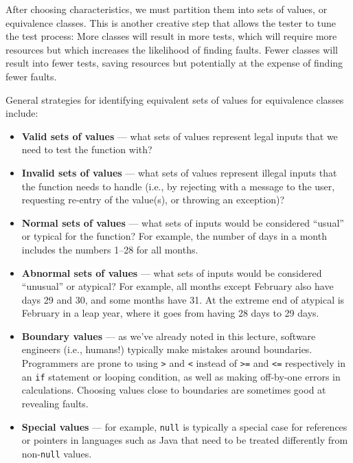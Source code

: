 After choosing characteristics, we must partition them into sets of values, or
equivalence classes. This is another creative step that allows the tester to
tune the test process: More classes will result in more tests, which will
require more resources but which increases the likelihood of finding faults.
Fewer classes will result into fewer tests, saving resources but potentially at
the expense of finding fewer faults. 

General strategies for identifying equivalent sets of values for equivalence
classes include:

\begin{itemize}

    \item {\bf Valid sets of values} --- what sets of values represent legal
    inputs that we need to test the function with?
    
    \item {\bf Invalid sets of values} --- what sets of values represent illegal
    inputs that the function needs to handle (i.e., by rejecting with a message
    to the user, requesting re-entry of the value(s), or throwing an exception)?

    \item {\bf Normal sets of values} --- what sets of inputs would be
    considered ``usual'' or typical for the function? For example, the number of
    days in a month includes the numbers 1--28 for all months.

    \item {\bf Abnormal sets of values} --- what sets of inputs would be
    considered ``unusual'' or atypical? For example, all months except February
    also have days 29 and 30, and some months have 31. At the extreme end of
    atypical is February in a leap year, where it goes from having 28 days to 29
    days. 

    \item {\bf Boundary values} --- as we've already noted in this lecture,
    software engineers (i.e., humans!) typically make mistakes around
    boundaries. Programmers are prone to using {\tt >} and {\tt <} instead of
    {\tt >=} and {\tt <=} respectively in an {\tt if} statement or looping
    condition, as well as making off-by-one errors in calculations. Choosing
    values close to boundaries are sometimes good at revealing faults.

    \item {\bf Special values} --- for example, {\tt null} is typically a
    special case for references or pointers in languages such as Java that need
    to be treated differently from non-{\tt null} values.

\end{itemize}    

